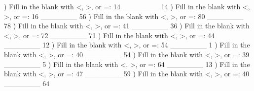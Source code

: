 \documentclass{article}%
\begin{document}
\newline%
) Fill in the blank with <, >, or =: 14 \_\_\_\_\_\_\_ 14%
\newline%
\newline%
) Fill in the blank with <, >, or =: 16 \_\_\_\_\_\_\_ 56%
\newline%
\newline%
) Fill in the blank with <, >, or =: 80 \_\_\_\_\_\_\_ 78%
\newline%
\newline%
) Fill in the blank with <, >, or =: 41 \_\_\_\_\_\_\_ 36%
\newline%
\newline%
) Fill in the blank with <, >, or =: 72 \_\_\_\_\_\_\_ 71%
\newline%
\newline%
) Fill in the blank with <, >, or =: 44 \_\_\_\_\_\_\_ 12%
\newline%
\newline%
) Fill in the blank with <, >, or =: 54 \_\_\_\_\_\_\_ 1%
\newline%
\newline%
) Fill in the blank with <, >, or =: 40 \_\_\_\_\_\_\_ 54%
\newline%
\newline%
) Fill in the blank with <, >, or =: 39 \_\_\_\_\_\_\_ 5%
\newline%
\newline%
) Fill in the blank with <, >, or =: 64 \_\_\_\_\_\_\_ 13%
\newline%
\newline%
) Fill in the blank with <, >, or =: 47 \_\_\_\_\_\_\_ 59%
\newline%
\newline%
) Fill in the blank with <, >, or =: 40 \_\_\_\_\_\_\_ 64%
\newline%
\newline%
\newline%
\end{document}
